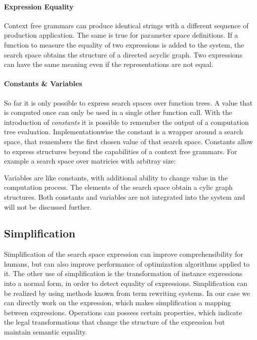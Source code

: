 \documentclass[english]{article}
\begin{document}
\paragraph{Expression Equality}
Context free grammars can produce identical strings with a different sequence of production application. The same is true for parameter space definitions.
If a function to measure the equality of two expressions is added to the system, the search space obtains the structure of a directed acyclic graph.
Two expressions can have the same meaning even if the representations are not equal.

\paragraph{Constants \& Variables}
So far it is only possible to express search spaces over function trees.
A value that is computed once can only be used in a single other function call. With the introduction of \textit{constants} it is possible to remember the output of a computation tree evaluation. Implementationwise the constant is a wrapper around a search space, that remembers the first chosen value of that search space.
Constants allow to express structures beyond the capabilities of a context free grammars. For example a search space over matricies with arbitray size:

Variables are like constants, with additional ability to change value in the computation process. The elements of the search space obtain a cylic graph structures.
Both constants and variables are not integrated into the system and will not be discussed further.

\subsection{Simplification}
Simplification of the search space expression can improve comprehensibility for humans, but can also improve performance of optimization algorithms applied to it. The other use of simplification is the transformation of instance expressions into a normal form, in order to detect equality of expressions.
Simplification can be realized by using methods known from term rewriting systems. In our case we can directly work on the expression, which makes simplification a mapping between expressions.
Operations can possess certain properties, which indicate the legal transformations that change the structure of the expression but maintain semantic equality.
\end{document}
